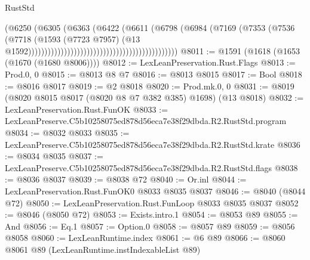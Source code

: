 \begin{lexlean}{RustStd}
\begin{coremodule}
                                                                      (@6250
                                                                        (@6305
                                                                          (@6363
                                                                            (@6422
                                                                              (@6611
                                                                                (@6798
                                                                                  (@6984
                                                                                    (@7169
                                                                                      (@7353
                                                                                        (@7536
                                                                                          (@7718
                                                                                            (@1593
                                                                                              (@7723
                                                                                                @7957)
                                                                                              (@13
                                                                                                @1592))))))))))))))))))))))))))))))))))))))))))))))
@8011 := @1591 (@1618 (@1653 (@1670 (@1680 @8006))))
@8012 := LexLeanPreservation.Rust.Flags
@8013 := Prod.{0, 0}
@8015 := @8013 @8 @7
@8016 := @8013 @8015
@8017 := Bool
@8018 := @8016 @8017
@8019 := @2 @8018
@8020 := Prod.mk.{0, 0}
@8031 := @8019 (@8020 @8015 @8017 (@8020 @8 @7 @382 @385) @1698) (@13 @8018)
@8032 := LexLeanPreservation.Rust.FunOK
@8033 := LexLeanPreserve.C5b10258075ed878d56eca7e38f29dbda.R2.RustStd.program
@8034 := @8032 @8033
@8035 := LexLeanPreserve.C5b10258075ed878d56eca7e38f29dbda.R2.RustStd.krate
@8036 := @8034 @8035
@8037 := LexLeanPreserve.C5b10258075ed878d56eca7e38f29dbda.R2.RustStd.flags
@8038 := @8036 @8037
@8039 := @8038 @72
@8040 := Or.inl
@8044 := LexLeanPreservation.Rust.FunOK0 @8033 @8035 @8037
@8046 := @8040 (@8044 @72)
@8050 := LexLeanPreservation.Rust.FunLoop @8033 @8035 @8037
@8052 := @8046 (@8050 @72)
@8053 := Exists.intro.{1}
@8054 := @8053 @89
@8055 := And
@8056 := Eq.{1}
@8057 := Option.{0}
@8058 := @8057 @89
@8059 := @8056 @8058
@8060 := LexLeanRuntime.index
@8061 := @6 @89
@8066 := @8060 @8061 @89 (LexLeanRuntime.instIndexableList @89)

\end{coremodule}
\end{lexlean}
